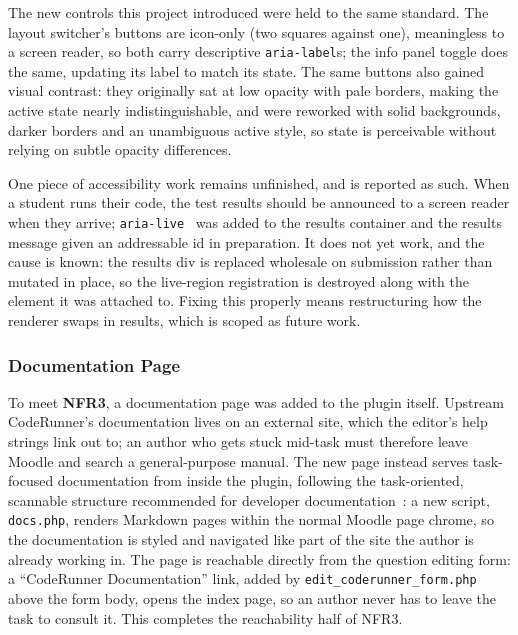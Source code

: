 The new controls this project introduced were held to the same standard. The layout switcher's buttons are icon-only (two squares against one), meaningless to a screen reader, so both carry descriptive \texttt{aria-label}s; the info panel toggle does the same, updating its label to match its state. The same buttons also gained visual contrast: they originally sat at low opacity with pale borders, making the active state nearly indistinguishable, and were reworked with solid backgrounds, darker borders and an unambiguous active style, so state is perceivable without relying on subtle opacity differences.

One piece of accessibility work remains unfinished, and is reported as such. When a student runs their code, the test results should be announced to a screen reader when they arrive; \texttt{aria-live}~\cite{w3c_wai_aria12_2023} was added to the results container and the results message given an addressable id in preparation. It does not yet work, and the cause is known: the results div is replaced wholesale on submission rather than mutated in place, so the live-region registration is destroyed along with the element it was attached to. Fixing this properly means restructuring how the renderer swaps in results, which is scoped as future work.

\subsubsection{Documentation Page}
To meet \textbf{NFR3}, a documentation page was added to the plugin itself. Upstream CodeRunner's documentation lives on an external site, which the editor's help strings link out to; an author who gets stuck mid-task must therefore leave Moodle and search a general-purpose manual. The new page instead serves task-focused documentation from inside the plugin, following the task-oriented, scannable structure recommended for developer documentation~\cite{googledevstyle}: a new script, \texttt{docs.php}, renders Markdown pages within the normal Moodle page chrome, so the documentation is styled and navigated like part of the site the author is already working in.
The page is reachable directly from the question editing form: a ``CodeRunner Documentation'' link, added by \texttt{edit\_coderunner\_form.php} above the form body, opens the index page, so an author never has to leave the task to consult it. This completes the reachability half of NFR3.

